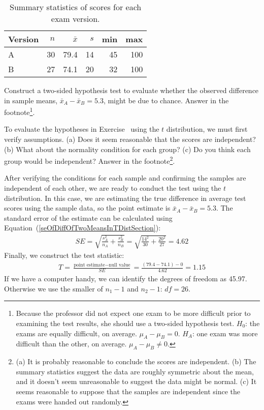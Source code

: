 \begin{table}[hht]
\centering
\begin{tabular}{l rrrrr}
\hline
Version\hspace{2mm}	& $n$	& $\bar{x}$	& $s$	& min	& max  \\
\hline
A		& 30		& 79.4		& 14 	& 45		& 100 \\
B		& 27		& 74.1		& 20		& 32		& 100 \\
\hline
\end{tabular}
\caption{Summary statistics of scores for each exam version.}
\label{summaryStatsForTwoVersionsOfExams}
\end{table}

\begin{exercise} \label{htSetupForEvaluatingTwoExamVersions}
Construct a two-sided hypothesis test to evaluate whether the observed difference in sample means, $\bar{x}_A - \bar{x}_B=5.3$, might be due to chance. Answer in the footnote\footnote{Because the professor did not expect one exam to be more difficult prior to examining the test results, she should use a two-sided hypothesis test. $H_0$: the exams are equally difficult, on average. $\mu_A - \mu_B = 0$. $H_A$: one exam was more difficult than the other, on average. $\mu_A - \mu_B \neq 0$.}.
\end{exercise}

\begin{exercise} \label{conditionsForTDistForEvaluatingTwoExamVersions}
To evaluate the hypotheses in Exercise~ using the $t$ distribution, we must first verify assumptions. (a) Does it seem reasonable that the scores are independent? (b) What about the normality condition for each group? (c) Do you think each group would be independent? Answer in the footnote\footnote{(a) It is probably reasonable to conclude the scores are independent. (b) The summary statistics suggest the data are roughly symmetric about the mean, and it doesn't seem unreasonable to suggest the data might be normal. (c) It seems reasonable to suppose that the samples are independent since the exams were handed out randomly.}.
\end{exercise}

After verifying the conditions for each sample and confirming the samples are independent of each other, we are ready to conduct the test using the $t$ distribution. In this case, we are estimating the true difference in average test scores using the sample data, so the point estimate is $\bar{x}_A - \bar{x}_B = 5.3$. The standard error of the estimate can be calculated using Equation~(\ref{seOfDiffOfTwoMeansInTDistSection}):
\begin{eqnarray*}
SE = \sqrt{\frac{s_A^2}{n_A} + \frac{s_B^2}{n_B}} = \sqrt{\frac{14^2}{30} + \frac{20^2}{27}} = 4.62
\end{eqnarray*}
Finally, we construct the test statistic:
\begin{eqnarray*}
T = \frac{\text{point estimate} - \text{null value}}{SE} = \frac{(79.4-74.1) - 0}{4.62} = 1.15
\end{eqnarray*}
If we have a computer handy, we can identify the degrees of freedom as 45.97. Otherwise we use the smaller of $n_1-1$ and $n_2-1$: $df=26$. 

